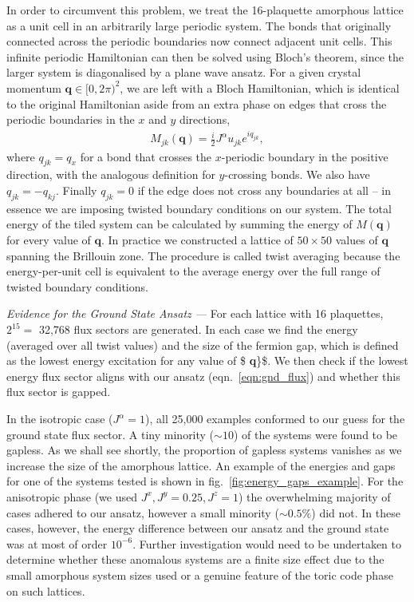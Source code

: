 In order to circumvent this problem, we treat the 16-plaquette amorphous
lattice as a unit cell in an arbitrarily large periodic system. The
bonds that originally connected across the periodic boundaries now
connect adjacent unit cells. This infinite periodic Hamiltonian can then
be solved using Bloch's theorem, since the larger system is diagonalised
by a plane wave ansatz. For a given crystal momentum
\(\textbf{q} \in [0,2\pi)^2\), we are left with a Bloch Hamiltonian,
which is identical to the original Hamiltonian aside from an extra phase
on edges that cross the periodic boundaries in the \(x\) and \(y\)
directions, \[\begin{aligned}
    M_{jk}(\textbf{q}) =  \frac{i}{2} J^{\alpha} u_{jk} e^{i q_{jk}},\end{aligned}\]
where \(q_{jk} = q_x\) for a bond that crosses the \(x\)-periodic
boundary in the positive direction, with the analogous definition for
\(y\)-crossing bonds. We also have \(q_{jk} = -q_{kj}\). Finally
\(q_{jk} = 0\) if the edge does not cross any boundaries at all -- in
essence we are imposing twisted boundary conditions on our system. The
total energy of the tiled system can be calculated by summing the energy
of \(M( \textbf{q})\) for every value of \(\textbf{q}\). In practice we
constructed a lattice of \(50 \times 50\) values of \(\textbf{q}\)
spanning the Brillouin zone. The procedure is called twist averaging
because the energy-per-unit cell is equivalent to the average energy
over the full range of twisted boundary conditions.

\emph{Evidence for the Ground State Ansatz ---} For each lattice with 16
plaquettes, \(2^{15} =\) 32,768 flux sectors are generated. In each case
we find the energy (averaged over all twist values) and the size of the
fermion gap, which is defined as the lowest energy excitation for any
value of \$ \textbf{q}\}\$. We then check if the lowest energy flux
sector aligns with our ansatz
(eqn.~\protect\hyperlink{eqn:gnd_flux}{{[}eqn:gnd\_flux{]}}) and whether
this flux sector is gapped.

In the isotropic case (\(J^\alpha = 1\)), all 25,000 examples conformed
to our guess for the ground state flux sector. A tiny minority
(\(\sim 10\)) of the systems were found to be gapless. As we shall see
shortly, the proportion of gapless systems vanishes as we increase the
size of the amorphous lattice. An example of the energies and gaps for
one of the systems tested is shown in
fig.~\protect\hyperlink{fig:energy_gaps_example}{{[}fig:energy\_gaps\_example{]}}.
For the anisotropic phase (we used \(J^x, J^y = 0.25, J^z = 1\)) the
overwhelming majority of cases adhered to our ansatz, however a small
minority (\(\sim 0.5 \%\)) did not. In these cases, however, the energy
difference between our ansatz and the ground state was at most of order
\(10^{-6}\). Further investigation would need to be undertaken to
determine whether these anomalous systems are a finite size effect due
to the small amorphous system sizes used or a genuine feature of the
toric code phase on such lattices.

